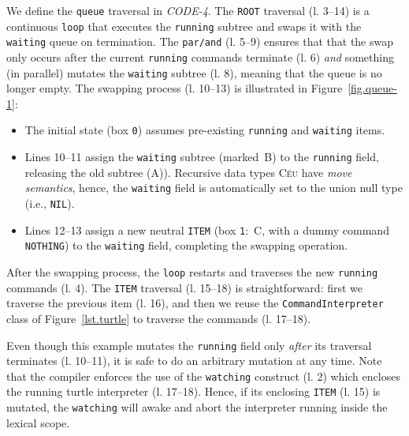 \documentclass{sig-alternate}
\newcommand{\CEU}{\textsc{C\'{e}u}\xspace}
\newcommand{\code}[1] {{\small{\texttt{#1}}}}
\newcommand{\MM}[1] {\textcircled{\tiny{\textsf{#1}}}}
\begin{document}
We define the \code{queue} traversal in \emph{CODE-4}.
%
The \code{ROOT} traversal (l. 3--14) is a continuous \code{loop} that 
executes the \code{running} subtree and swaps it with the \code{waiting} queue 
on termination.
The \code{par/and} (l. 5--9) ensures that that the swap only occurs after 
the current \code{running} commands terminate (l. 6) \emph{and} something (in 
parallel) mutates the \code{waiting} subtree (l. 8), meaning that the queue 
is no longer empty.
The swapping process (l. 10--13) is illustrated in Figure~\ref{fig.queue-1}: 
%
\begin{itemize}
%
\item The initial state (box \code{0}) assumes pre-existing \code{running} and 
\code{waiting} items.
%
\item Lines 10--11 assign the \code{waiting} subtree (marked~\MM{B}) to the 
\code{running} field, releasing the old subtree (\MM{A})).
Recursive data types \CEU have \emph{move semantics}, hence, the \code{waiting} 
field is automatically set to the union null type (i.e., \code{NIL}).
%
\item Lines 12--13 assign a new neutral \code{ITEM} (box \code{1}:~\MM{C}, with 
a dummy command \code{NOTHING}) to the \code{waiting} field, completing the 
swapping operation.
%
\end{itemize}
%
After the swapping process, the \code{loop} restarts and traverses the new 
\code{running} commands (l. 4).
%
The \code{ITEM} traversal (l. 15--18) is straightforward:
first we traverse the previous item (l. 16), and then we reuse the 
\code{CommandInterpreter} class of Figure~\ref{lst.turtle} to traverse the 
commands (l. 17--18).

Even though this example mutates the \code{running} field only \emph{after} its 
traversal terminates (l. 10--11), it is safe to do an arbitrary mutation at 
any time.
Note that the compiler enforces the use of the \code{watching} construct (l. 
2) which encloses the running turtle interpreter (l. 17--18).
Hence, if its enclosing \code{ITEM} (l. 15) is mutated, the \code{watching} 
will awake and abort the interpreter running inside the lexical scope.
\end{document}
